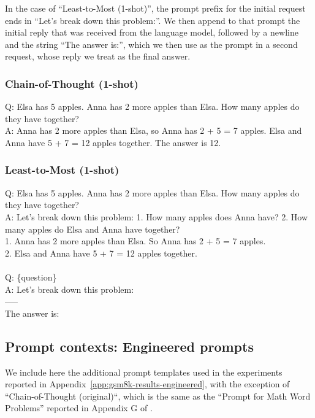 In the case of ``Least-to-Most (1-shot)'', the prompt prefix for the initial request ends in ``Let's break down this problem:''. We then append to that prompt the initial reply that was received from the language model, followed by a newline and the string ``The answer is:'', which we then use as the prompt in a second request, whose reply we treat as the final answer.

\subsubsection{Chain-of-Thought (1-shot)}

Q: Elsa has 5 apples. Anna has 2 more apples than Elsa. How many apples do they have together? \\
A: Anna has 2 more apples than Elsa, so Anna has 2 + 5 = 7 apples. Elsa and Anna have 5 + 7 = 12 apples together. The answer is 12. \\

\subsubsection{Least-to-Most (1-shot)}

Q: Elsa has 5 apples. Anna has 2 more apples than Elsa. How many apples do they have together? \\
A: Let's break down this problem: 1. How many apples does Anna have? 2. How many apples do Elsa and Anna have together? \\
1. Anna has 2 more apples than Elsa. So Anna has 2 + 5 = 7 apples. \\
2. Elsa and Anna have 5 + 7 = 12 apples together. \\
 \\
Q: \{question\} \\
A: Let's break down this problem: \\
----- \\
The answer is: \\

\subsection{Prompt contexts: Engineered prompts}
\label{app:gsm8k-prompts-engineered}

We include here the additional prompt templates used in the experiments reported in Appendix~\ref{app:gsm8k-results-engineered}, with the exception of ``Chain-of-Thought (original)``, which is the same as the ``Prompt for Math Word Problems'' reported in Appendix G of \citet{wei2022chain}.


